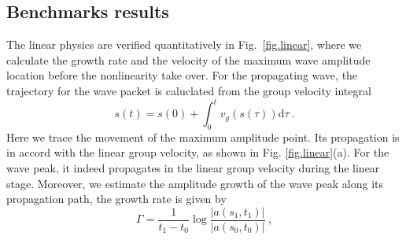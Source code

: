 \subsection{Benchmarks results}
The linear physics are verified quantitatively in Fig.~\ref{fig.linear}, where we calculate the growth rate and the velocity of the maximum wave amplitude location before the nonlinearity take over. 
For the propagating wave, the trajectory for the wave packet is caluclated from the group velocity integral
\begin{equation}
    s(t) = s(0) + \int_0^{t} v_g(s(\tau)) \mathrm{d} \tau~.
\end{equation}
Here we trace the movement of the maximum amplitude point. Its propagation is in accord with the linear group velocity, as shown in Fig. \ref{fig.linear}(a). 
For the wave peak, it indeed propagates in the linear group velocity during the linear stage.
Moreover, we estimate the amplitude growth of the wave peak along its propagation path, the growth rate is given by \cite{nogi2022}
\begin{equation}\label{eq.gm_ver}
        \Gamma = \frac{1}{t_1-t_0}\log\frac{|a(s_1,t_1)|}{|a(s_0,t_0)|}~,
\end{equation}
